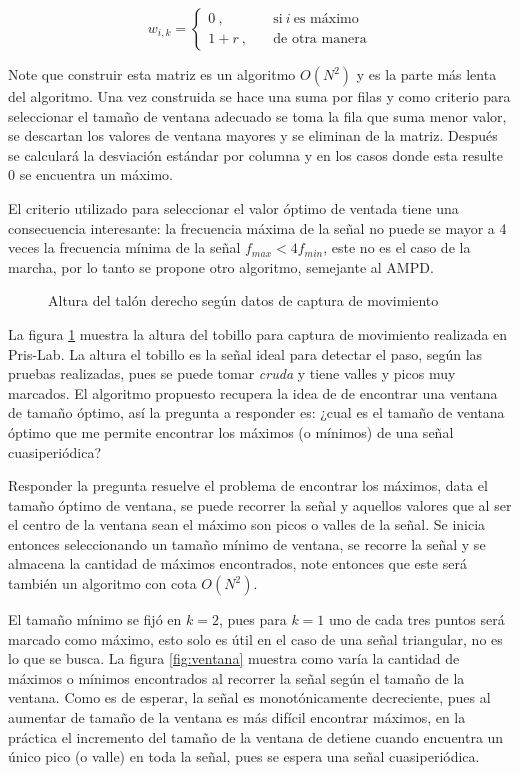 \begin{equation}\label{ampd_matriz}
    w_{i,k} =
    \begin{cases}
    0\ , & \quad \text{si}\ i\ \text{es máximo} \\ 
    1 + r\ , & \quad \text{de otra manera} 
    \end{cases}
\end{equation}

Note que construir esta matriz es un algoritmo $O(N^2)$ y es la parte más lenta del algoritmo. Una vez construida se hace una suma por filas y como criterio para seleccionar el tamaño de ventana adecuado se toma la fila que suma menor valor, se descartan los valores de ventana mayores y se eliminan de la matriz. Después se calculará la desviación estándar por columna y en los casos donde esta resulte $0$ se encuentra un máximo. 

El criterio utilizado para seleccionar el valor óptimo de ventada tiene una consecuencia interesante: la frecuencia máxima de la señal no puede se mayor a 4 veces la frecuencia mínima de la señal $f_{max} < 4 f_{min}$, este no es el caso de la marcha, por lo tanto se propone otro algoritmo, semejante al AMPD.

\begin{figure}
    \centering
    
    \caption{Altura del talón derecho según datos de captura de movimiento}
    \label{fig:senal}
\end{figure}

La figura \ref{fig:senal} muestra la altura del tobillo para captura de movimiento realizada en Pris-Lab. La altura el tobillo es la señal ideal para detectar el paso, según las pruebas realizadas, pues se puede tomar \emph{cruda} y tiene valles y picos muy marcados. El algoritmo propuesto recupera la idea de \cite{scholkmann} de encontrar una ventana de tamaño óptimo, así la pregunta a responder es: ¿cual es el tamaño de ventana óptimo que me permite encontrar los máximos (o mínimos) de una señal cuasiperiódica?

Responder la pregunta resuelve el problema de encontrar los máximos, data el tamaño óptimo de ventana, se puede recorrer la señal y aquellos valores que al ser el centro de la ventana sean el máximo son picos o valles de la señal. Se inicia entonces seleccionando un tamaño mínimo de ventana, se recorre la señal y se almacena la cantidad de máximos encontrados, note entonces que este será también un algoritmo con cota $O(N^2)$. 

El tamaño mínimo se fijó en $k = 2$, pues para $k = 1$ uno de cada tres puntos será marcado como máximo, esto solo es útil en el caso de una señal triangular, no es lo que se busca. La figura \ref{fig:ventana} muestra como varía la cantidad de máximos o mínimos encontrados al recorrer la señal según el tamaño de la ventana. Como es de esperar, la señal es monotónicamente decreciente, pues al aumentar de tamaño de la ventana es más difícil encontrar máximos, en la práctica el incremento del tamaño de la ventana de detiene cuando encuentra un único pico (o valle) en toda la señal, pues se espera una señal cuasiperiódica. 

